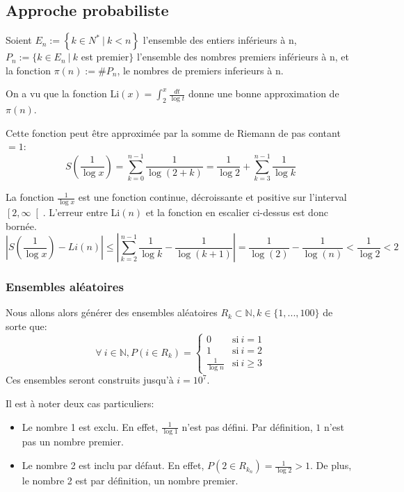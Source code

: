 \documentclass[../main.tex]{report}
\begin{document}
    \label{sec:test1}
    
\subsection{Approche probabiliste}
Soient $E_n := \left\{ k \in N^* ~|~k < n \right\}$ l'ensemble des entiers inférieurs à n, $ P_n := \{k \in E_n~|~ k$ est premier$ \}$ l'ensemble des nombres premiers inférieurs à n, et la fonction $\pi (n) := \#P_n$, le nombres de premiers inferieurs à n.

On a vu que la fonction Li$(x) = \int_2^x \frac{dt}{\log t}$ 
donne une bonne approximation de $\pi(n)$.

Cette fonction peut être approximée par la somme de Riemann de pas contant $=1$:
\begin{equation}
\label{eq:SommeDeRiemann}
S \left({\frac{1}{\log x}} \right)
= \sum_{k=0}^{n-1} \frac{1}{\log(2 + k)}
= \frac{1}{\log 2} + \sum_{k=3}^{n-1} \frac{1}{\log k}
\end{equation}


La fonction $\frac{1}{\log x}$ est une fonction continue, décroissante et positive sur l'interval $\left[2, \infty \right[$. 
L'erreur entre Li$(n)$ et la fonction en escalier ci-dessus est donc bornée. 
 \[ 
\left| S(\frac{1}{\log x}) - Li(n) \right|
\leq \left| \sum_{k=2}^{n-1} \frac{1}{\log k} - \frac{1}{\log (k+1)} \right| 
 = \frac{1}{\log (2)} - \frac{1}{\log (n)}
 < \frac{1}{\log 2}
 < 2
 \]


\subsubsection{Ensembles aléatoires} 

Nous allons alors générer des ensembles aléatoires $R_{k} \subset \mathbb{N}, k \in \{1,...,100\}$ de sorte que:
\[
\forall~i \in \mathbb{N}, P(i \in R_{k}) = 
\left\{ 
    \begin{array}{cl}
         0 & \mbox{si}~i = 1 \\
         1 & \mbox{si}~i = 2 \\
         \frac{1}{\log n} & \mbox{si}~i \geq 3
    \end{array}
\right.
\]
Ces ensembles seront construits jusqu'à $i = 10^7$.

Il est à noter deux cas particuliers:
\begin{itemize} 
    \item Le nombre 1 est exclu. En effet, $\frac{1}{\log 1}$ n'est pas défini. Par définition, $1$ n'est pas un nombre premier.
    \item Le nombre 2 est inclu par défaut. En effet, $P(2 \in R_{k_n}) = \frac{1}{\log 2} > 1$. De plus, le nombre 2 est par définition, un nombre premier.
\end{itemize}
\end{document}
